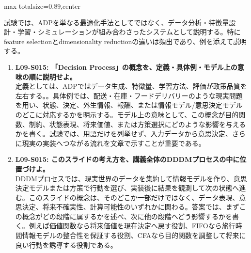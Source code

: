 \begin{minipage}[t]{0.58\textwidth}
\begin{adjustbox}{max totalsize={\textwidth}{0.89\textheight},center}
\begin{minipage}{\textwidth}
試験では、ADPを単なる最適化手法としてではなく、データ分析・特徴量設計・学習・シミュレーションが組み合わさったシステムとして説明する。特にfeature selectionとdimensionality reductionの違いは頻出であり、例を添えて説明する。\par{}\begin{enumerate}\item \textbf{L09-S015: 「Decision Process」の概念を、定義・具体例・モデル上の意味の順に説明せよ。}\\定義としては、ADPではデータ生成、特徴量、学習方法、評価が政策品質を左右する。。具体例では、配送・在庫・フードデリバリーのような現実問題を用い、状態、決定、外生情報、報酬、または情報モデル/意思決定モデルのどこに対応するかを明示する。モデル上の意味として、この概念が目的関数、制約、状態表現、将来価値、または方策選択にどのような影響を与えるかを書く。試験では、用語だけを列挙せず、入力データから意思決定、さらに現実の実装へつながる流れを文章で示すことが重要である。\item \textbf{L09-S015: このスライドの考え方を、講義全体のDDDMプロセスの中に位置づけよ。}\\DDDMプロセスでは、現実世界のデータを集約して情報モデルを作り、意思決定モデルまたは方策で行動を選び、実装後に結果を観測して次の状態へ進む。このスライドの概念は、そのどこか一部だけではなく、データ表現、意思決定、将来不確実性、計算可能性のいずれかに関わる。答案では、まずこの概念がどの段階に属するかを述べ、次に他の段階へどう影響するかを書く。例えば価値関数なら将来価値を現在決定へ戻す役割、FIFOなら旅行時間情報モデルの整合性を保証する役割、CFAなら目的関数を調整して将来に良い行動を誘導する役割である。\end{enumerate}
\end{minipage}
\end{adjustbox}
\end{minipage}



